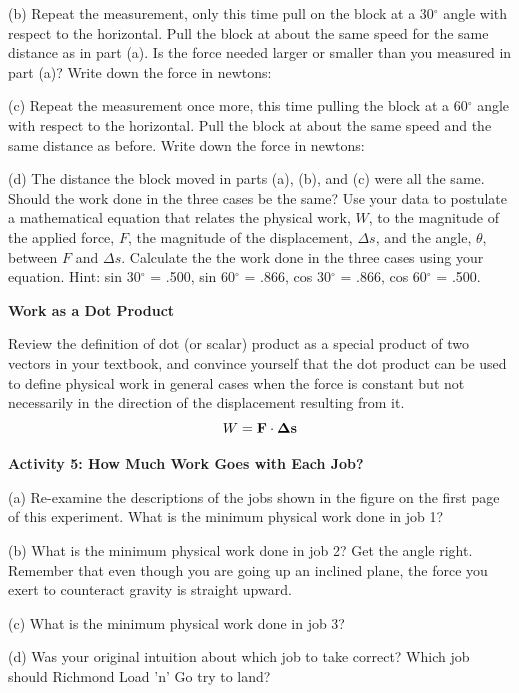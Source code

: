 \newpage
(b) Repeat the measurement, only this time pull on the block at a 30\( ^{\circ } \) angle with respect to the horizontal. Pull the block at about the same speed for the same distance as in part (a). Is the force needed larger or smaller than you measured in part (a)? Write down the force in newtons:
\vspace{15mm}

(c) Repeat the measurement once more, this time pulling the block at a 60\( ^{\circ } \) angle with respect to the horizontal.  Pull the block at about the same speed and the same distance as before. Write down the force in newtons:
\vspace{15mm}

(d) The distance the block moved in parts (a), (b), and (c) were all the same.  Should the work done in the three cases be the same?  Use your data to postulate a mathematical equation
that relates the physical work, $W$, to the magnitude of the applied force, $F$,
the magnitude of the displacement, \( \Delta  s\), and the angle, \( \theta  \),
between $F$ and \( \Delta  s\).  Calculate the the work done in the three cases using your equation. 
 Hint: sin 30\( ^{\circ } \) = .500, sin 60\( ^{\circ } \) = .866, cos 30\( ^{\circ } \) = .866, cos 60\( ^{\circ } \)
= .500. 
\vspace{40mm}

\textbf{Work as a Dot Product }

Review the definition of dot (or scalar) product as a special product of two
vectors in your textbook, and convince yourself that the dot product can be
used to define physical work in general cases when the force is constant but
not necessarily in the direction of the displacement resulting from it. 
\[W={\bf F}\cdot {\bf \Delta s}\]


\textbf{Activity 5: How Much Work Goes with Each Job? }

(a) Re-examine the descriptions of the jobs shown in the figure on the first
page of this experiment. What is the minimum physical work done in job 1?
\vspace{20mm}

(b) What is the minimum physical work done in job 2? Get the angle right. 
Remember that even though you are going up an inclined plane, the force you 
exert to counteract gravity is straight upward.
\answerspace{25mm}


\pagebreak[2]
(c) What is the minimum physical work done in job 3?
\answerspace{25mm}

(d) Was your original intuition about which job to take correct? Which job 
should Richmond Load 'n' Go try to land?
\vspace{20mm}

